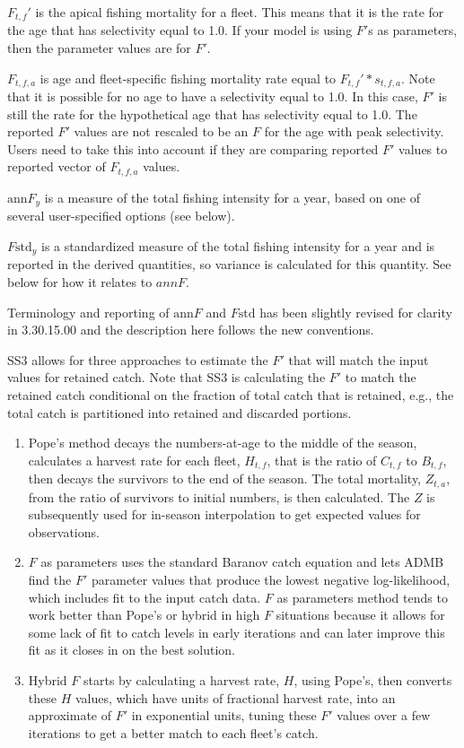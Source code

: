 $F_{t,f}'$ is the apical fishing mortality for a fleet. This means that it is the rate for the age that has selectivity equal to 1.0. If your model is using $F'$s as parameters, then the parameter values are for $F'$.

$F_{t,f,a}$ is age and fleet-specific fishing mortality rate equal to $F_{t,f}' * s_{t,f,a}$. Note that it is possible for no age to have a selectivity equal to 1.0. In this case, $F'$ is still the rate for the hypothetical age that has selectivity equal to 1.0. The reported $F'$ values are not rescaled to be an $F$ for the age with peak selectivity. Users need to take this into account if they are comparing reported $F'$ values to reported vector of $F_{t,f,a}$ values.

$\text{ann}F_y$ is a measure of the total fishing intensity for a year, based on one of several user-specified options (see below).

$F\text{std}_y$ is a standardized measure of the total fishing intensity for a year and is reported in the derived quantities, so variance is calculated for this quantity. See below for how it relates to $annF$.

Terminology and reporting of $\text{ann}F$ and $F\text{std}$ has been slightly revised for clarity in 3.30.15.00 and the description here follows the new conventions.

SS3 allows for three approaches to estimate the $F'$ that will match the input values for retained catch. Note that SS3 is calculating the $F'$ to match the retained catch conditional on the fraction of total catch that is retained, e.g., the total catch is partitioned into retained and discarded portions.

\begin{enumerate}
	\item Pope's method decays the numbers-at-age to the middle of the season, calculates a harvest rate for each fleet, $H_{t,f}$, that is the ratio of $C_{t,f}$ to $B_{t,f}$, then decays the survivors to the end of the season. The total mortality, $Z_{t,a}$, from the ratio of survivors to initial numbers, is then calculated. The $Z$ is subsequently used for in-season interpolation to get expected values for observations.
	
	\item $F$ as parameters uses the standard Baranov catch equation and lets ADMB find the $F'$ parameter values that produce the lowest negative log-likelihood, which includes fit to the input catch data. $F$ as parameters method tends to work better than Pope's or hybrid in high $F$ situations because it allows for some lack of fit to catch levels in early iterations and can later improve this fit as it closes in on the best solution.
	
	\item Hybrid $F$ starts by calculating a harvest rate, $H$, using Pope's, then converts these $H$ values, which have units of fractional harvest rate, into an approximate of $F'$ in exponential units, tuning these $F'$ values over a few iterations to get a better match to each fleet's catch.
\end{enumerate}

